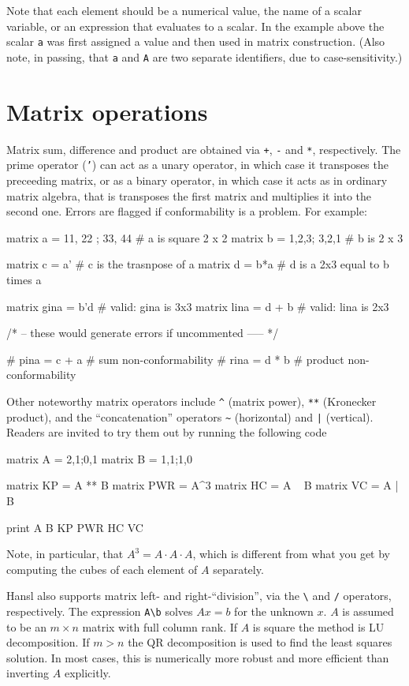 Note that each element should be a numerical value, the name of a
scalar variable, or an expression that evaluates to a scalar. In the
example above the scalar \texttt{a} was first assigned a value and
then used in matrix construction. (Also note, in passing, that
\texttt{a} and \texttt{A} are two separate identifiers, due to
case-sensitivity.)

\section{Matrix operations}
\label{sec:mat-op}

Matrix sum, difference and product are obtained via \texttt{+},
\texttt{-} and \texttt{*}, respectively. The prime operator
(\texttt{'}) can act as a unary operator, in which case it transposes
the preceeding matrix, or as a binary operator, in which case it acts
as in ordinary matrix algebra, that is transposes the first matrix and
multiplies it into the second one. Errors are flagged if
conformability is a problem. For example:
\begin{code}
  matrix a = {11, 22 ; 33, 44}  # a is square 2 x 2
  matrix b = {1,2,3; 3,2,1}     # b is 2 x 3

  matrix c = a'         # c is the trasnpose of a
  matrix d = b*a        # d is a 2x3 equal to b times a

  matrix gina = b'd     # valid: gina is 3x3
  matrix lina = d + b   # valid: lina is 2x3

  /* -- these would generate errors if uncommented ----- */

  # pina = c + a  # sum non-conformability
  # rina = d * b  # product non-conformability
\end{code}

Other noteworthy matrix operators include \texttt{\^} (matrix power),
\texttt{**} (Kronecker product), and the ``concatenation'' operators
\verb|~| (horizontal) and \texttt{|} (vertical). Readers are invited
to try them out by running the following code
\begin{code}
matrix A = {2,1;0,1}
matrix B = {1,1;1,0}

matrix KP = A ** B
matrix PWR = A^3 
matrix HC = A ~ B
matrix VC = A | B

print A B KP PWR HC VC
\end{code}
Note, in particular, that $A^3 = A \cdot A \cdot A$, which is different
from what you get by computing the cubes of each element of $A$
separately.

Hansl also supports matrix left- and right-``division'', via the
\verb'\' and \verb'/' operators, respectively. The expression
\verb|A\b| solves $Ax = b$ for the unknown $x$. $A$ is assumed to be
an $m \times n$ matrix with full column rank. If $A$ is square the
method is LU decomposition. If $m > n$ the QR decomposition is used to
find the least squares solution. In most cases, this is numerically
more robust and more efficient than inverting $A$ explicitly.


